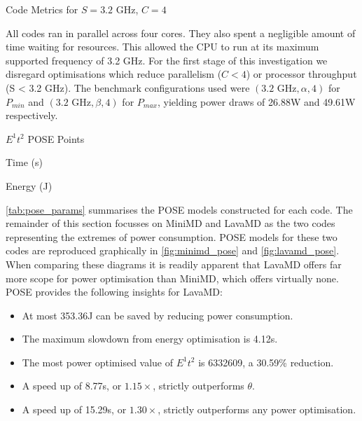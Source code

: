 \begin{table}
\centering
\caption{Code Metrics for $S = 3.2\text{ GHz}$, $C = 4$}
\label{tab:code_metrics}

\end{table}

All codes ran in parallel across four cores.
They also spent a negligible amount of time waiting for resources. 
This allowed the CPU to run at its maximum supported frequency of 3.2 GHz.
For the first stage of this investigation we disregard optimisations which reduce parallelism ($C < 4$) or processor throughput (S < 3.2 GHz).
The benchmark configurations used were $(\text{3.2 GHz}, \alpha, 4)$ for $P_{min}$ and $(\text{3.2 GHz}, \beta, 4)$ for $P_{max}$, yielding power draws of 26.88W and 49.61W respectively.

\begin{table}
  \setlength{\tabcolsep}{.5em}
  \caption{$E^1t^2$ POSE Points}
  \begin{subtable}{\textwidth}
  \centering
  \caption{Time (s)}
  
  \end{subtable}
  \begin{subtable}{\textwidth}
  \centering
  \caption{Energy (J)}
  
  \end{subtable}
  \label{tab:pose_params}
\end{table}

\autoref{tab:pose_params} summarises the POSE models constructed for each code.
The remainder of this section focusses on MiniMD and LavaMD as the two codes representing the extremes of power consumption.
POSE models for these two codes are reproduced graphically in \autoref{fig:minimd_pose} and \autoref{fig:lavamd_pose}.
When comparing these diagrams it is readily apparent that LavaMD offers far more scope for power optimisation than MiniMD, which offers virtually none. 
POSE provides the following insights for LavaMD:
\begin{itemize}
  \item At most 353.36J can be saved by reducing power consumption.
  \item The maximum slowdown from energy optimisation is 4.12s.
  \item The most power optimised value of $E^1t^2$ is 6332609, a 30.59\% reduction.
  \item A speed up of 8.77s, or $1.15 \times$, strictly outperforms $\theta$.
  \item A speed up of 15.29s, or $1.30 \times$, strictly outperforms any power optimisation.
\end{itemize}

